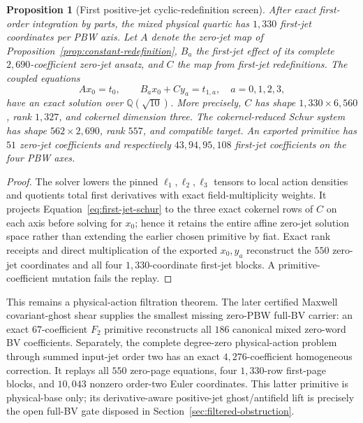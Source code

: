 \documentclass[11pt]{article}
\newtheorem{proposition}[theorem]{Proposition}
\theoremstyle{definition}
\theoremstyle{remark}
\newcommand{\Q}{\mathbb Q}
\begin{document}
\begin{proposition}[First positive-jet cyclic-redefinition screen]
\label{prop:first-jet-redefinition}
After exact first-order integration by parts, the mixed physical quartic has
$1{,}330$ first-jet coordinates per PBW axis.  Let $A$ denote the zero-jet
map of Proposition~\ref{prop:constant-redefinition}, $B_a$ the first-jet
effect of its complete $2{,}690$-coefficient zero-jet ansatz, and $C$ the map
from first-jet redefinitions.  The coupled equations
\begin{equation}\label{eq:first-jet-schur}
 Ax_0=t_0,
 \qquad B_ax_0+Cy_a=t_{1,a},\quad a=0,1,2,3,
\end{equation}
have an exact solution over $\Q(\sqrt{10})$.  More precisely, $C$ has shape
$1{,}330\times6{,}560$, rank $1{,}327$, and cokernel dimension three.  The
cokernel-reduced Schur system has shape $562\times2{,}690$, rank $557$, and
compatible target.  An exported primitive has $51$ zero-jet coefficients and
respectively $43,94,95,108$ first-jet coefficients on the four PBW axes.
\end{proposition}

\begin{proof}
The solver lowers the pinned $\ell_1,\ell_2,\ell_3$ tensors to local action
densities and quotients total first derivatives with exact field-multiplicity
weights.  It projects Equation~\eqref{eq:first-jet-schur} to the three exact
cokernel rows of $C$ on each axis before solving for $x_0$; hence it retains
the entire affine zero-jet solution space rather than extending the earlier
chosen primitive by fiat.  Exact rank receipts and direct multiplication of
the exported $x_0,y_a$ reconstruct the $550$ zero-jet coordinates and all
four $1{,}330$-coordinate first-jet blocks.  A primitive-coefficient mutation
fails the replay.
\end{proof}

This remains a physical-action filtration theorem.  The later certified
Maxwell covariant-ghost shear supplies the smallest missing zero-PBW full-BV
carrier: an exact $67$-coefficient $F_2$ primitive reconstructs all $186$
canonical mixed zero-word BV coefficients.  Separately, the complete
degree-zero physical-action problem through summed input-jet order two has an
exact $4{,}276$-coefficient homogeneous correction.  It replays all $550$
zero-page equations, four $1{,}330$-row first-page blocks, and $10{,}043$
nonzero order-two Euler coordinates.  This latter primitive is physical-base
only; its derivative-aware positive-jet ghost/antifield lift is precisely the
open full-BV gate disposed in Section~\ref{sec:filtered-obstruction}.
\end{document}
